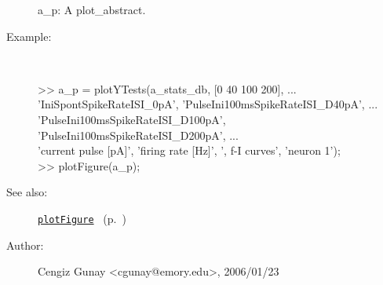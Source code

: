 \begin{description}
	a\_p: A plot\_abstract.
%
\item[Example:]~
\begin{lyxcode} >> a\_p = plotYTests(a\_stats\_db, [0 40 100 200], ...\\%
                      {'IniSpontSpikeRateISI\_0pA', 'PulseIni100msSpikeRateISI\_D40pA', ...\\%
                       'PulseIni100msSpikeRateISI\_D100pA', 'PulseIni100msSpikeRateISI\_D200pA'}, ...\\%
                      {'current pulse [pA]', 'firing rate [Hz]'}, ', f-I curves', 'neuron 1');\\%
 >> plotFigure(a\_p);\\%
\end{lyxcode}
%
\item[See also:]%
\hyperlink{ref_plotFigure}{\texttt{plotFigure}}%
\ (p.~\pageref{ref_plotFigure})%
%
%
\item[Author:]%
Cengiz Gunay <cgunay@emory.edu>, 2006/01/23%
\end{description}
\methodline%
